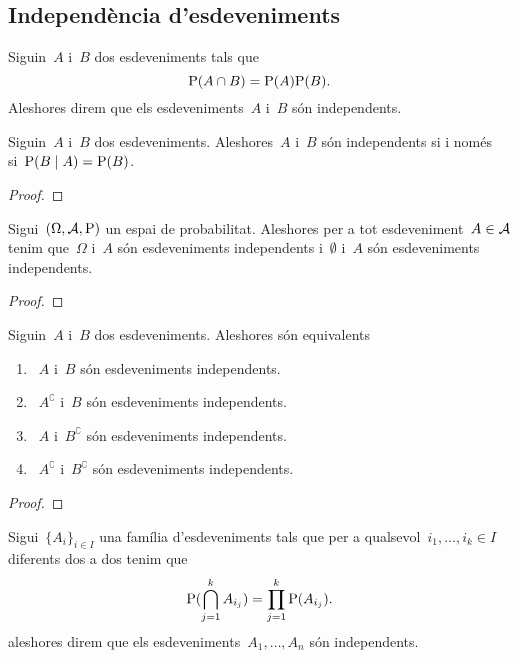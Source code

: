 \documentclass[../../main.tex]{subfiles}
\begin{document}
\subsection{Independència d'esdeveniments}
	\begin{definition}
		\label{def:esdeveniments independents}
		Siguin~\(A\) i~\(B\) dos esdeveniments tals que
		\[
		    \mathrm{P}(A\cap B)=\mathrm{P}(A)\mathrm{P}(B).
		\]
		Aleshores direm que els esdeveniments~\(A\) i~\(B\) són independents.
	\end{definition}
	\begin{observation}
		\label{obs:condició equivalent a esdeveniments independents}
		Siguin~\(A\) i~\(B\) dos esdeveniments.
		Aleshores~\(A\) i~\(B\) són independents si i només si~\(\mathrm{P}(B\mid A)=\mathrm{P}(B)\).
		\begin{proof}
		\end{proof}
	\end{observation}
	\begin{example}
	\end{example}
	\begin{proposition}
		\label{prop:el buit i el total són esdeveniments independents de la resta}
		\label{prop:el buit és un esdeveniment independent de la resta}
		\label{prop:el total és un esdeveniment independent de la resta}
		Sigui~\((\Omega,\mathcal{A},\mathrm{P})\) un espai de probabilitat.
		Aleshores per a tot esdeveniment~\(A\in\mathcal{A}\) tenim que~\(\Omega\) i~\(A\) són esdeveniments independents i~\(\emptyset\) i~\(A\) són esdeveniments independents.
		\begin{proof}
		\end{proof}
	\end{proposition}
	\begin{proposition}
		\label{prop:el complementari d'un esdeveniment conserva la independència}
		Siguin~\(A\) i~\(B\) dos esdeveniments.
		Aleshores són equivalents
		\begin{enumerate}
			\item~\(A\) i~\(B\) són esdeveniments independents.
			\item~\(A^{\complement}\) i~\(B\) són esdeveniments independents.
			\item~\(A\) i~\(B^{\complement}\) són esdeveniments independents.
			\item~\(A^{\complement}\) i~\(B^{\complement}\) són esdeveniments independents.
		\end{enumerate}
		\begin{proof}
		\end{proof}
	\end{proposition}
	\begin{definition}
		\label{def:esdeveniments independents cas general}
		Sigui~\(\{A_{i}\}_{i\in I}\) una família d'esdeveniments tals que per a qualsevol~\(i_{1},\dots,i_{k}\in I\) diferents dos a dos tenim que
		\[
		    \mathrm{P}(\bigcap_{j=1}^{k}A_{i_{j}})=\prod_{j=1}^{k}\mathrm{P}(A_{i_{j}}).
		\]
		aleshores direm que els esdeveniments~\(A_{1},\dots,A_{n}\) són independents.
	\end{definition}
\end{document}
